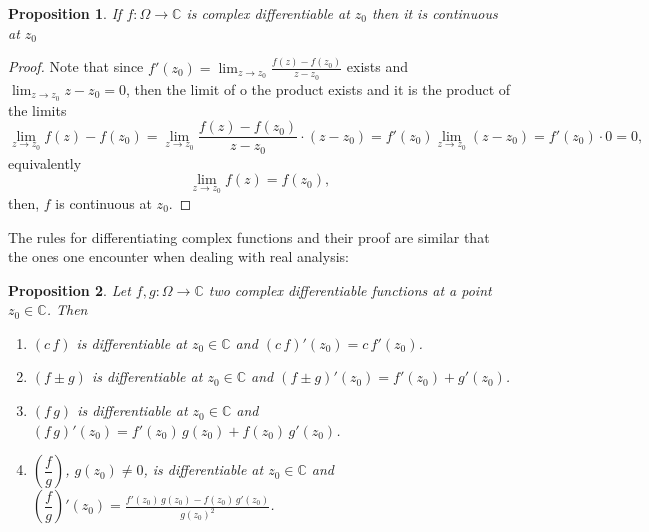 \documentclass{amsart}
\newtheorem{prop}{Proposition}
\begin{document}
\begin{prop}
If \(f:\Omega \to \mathbb{C}\) is complex differentiable at \(z_0\) then it is continuous at \(z_0\)
\end{prop}
\begin{proof}
Note that since \(f'(z_0) = \lim_{z\to z_0}\frac{f(z)- f(z_0)}{z - z_0}\) exists and \(\lim_{z\to z_0} z - z_0 = 0\), then the limit of o the product exists and it is the product of the limits
\[ \lim_{z\to z_0}f(z)- f(z_0) = \lim_{z\to z_0}\frac{f(z)- f(z_0)}{z - z_0} \cdot (z - z_0) = f'(z_0) \lim_{z\to z_0} (z - z_0) = f'(z_0) \cdot 0 = 0, \]
equivalently
\[ \lim_{z\to z_0}f(z) = f(z_0),\]
then, \(f\) is continuous at \(z_0\).
\end{proof}

The rules for differentiating complex functions and their proof are similar that the ones one encounter when dealing with real analysis:
\begin{prop}
Let \(f,g:\Omega \to \mathbb{C}\) two complex differentiable functions at a point \(z_0\in \mathbb{C}\). Then
\begin{enumerate}
\item \((c\,f)\) is differentiable at \(z_0\in \mathbb{C}\) and \((c\,f)'(z_0) = c\,f'(z_0)\).
\item \((f\pm g)\) is differentiable at \(z_0\in \mathbb{C}\) and \((f\pm g)'(z_0) = f'(z_0) + g'(z_0)\).
\item \((f\,g )\) is differentiable at \(z_0\in \mathbb{C}\) and \((f\, g)'(z_0) = f'(z_0)\,g(z_0) + f(z_0)\,g'(z_0)\).
\item \(\left(\dfrac{f}{g}\right)\), \(g(z_0) \neq 0\), is differentiable at \(z_0\in \mathbb{C}\) and \(\left(\dfrac{f}{g}\right)'(z_0) = \frac{f'(z_0)\,g(z_0) - f(z_0)\,g'(z_0)}{g(z_0)^2}\).
\end{enumerate}
\end{prop}
\end{document}
